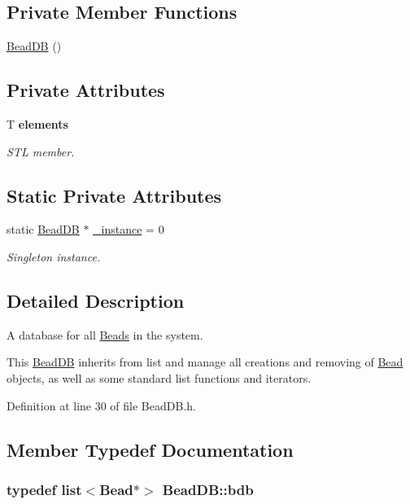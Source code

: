 \subsection*{Private Member Functions}
\begin{DoxyCompactItemize}
\item 
\hyperlink{classBeadDB_ac25beed230d37dc184ca8c7e7b4ea087}{Bead\+D\+B} ()
\end{DoxyCompactItemize}
\subsection*{Private Attributes}
\begin{DoxyCompactItemize}
\item 
T {\bfseries elements}
\begin{DoxyCompactList}\small\item\em S\+T\+L member. \end{DoxyCompactList}\end{DoxyCompactItemize}
\subsection*{Static Private Attributes}
\begin{DoxyCompactItemize}
\item 
static \hyperlink{classBeadDB}{Bead\+D\+B} $\ast$ \hyperlink{classBeadDB_a99d68441bc8e90450f7d1fd6d65acd22}{\+\_\+instance} = 0
\begin{DoxyCompactList}\small\item\em Singleton instance. \end{DoxyCompactList}\end{DoxyCompactItemize}


\subsection{Detailed Description}
A database for all \hyperlink{classBead}{Beads} in the system. 

This \hyperlink{classBeadDB}{Bead\+D\+B} inherits from list and manage all creations and removing of \hyperlink{classBead}{Bead} objects, as well as some standard list functions and iterators. 

Definition at line 30 of file Bead\+D\+B.\+h.



\subsection{Member Typedef Documentation}
\hypertarget{classBeadDB_a0312ccca7bb1de087f91481aec353d60}{
\subsubsection[{bdb}]{\setlength{\rightskip}{0pt plus 5cm}typedef list$<${\bf Bead}$\ast$$>$ {\bf Bead\+D\+B\+::bdb}\hspace{0.3cm}{\ttfamily [private]}}}\label{classBeadDB_a0312ccca7bb1de087f91481aec353d60}


